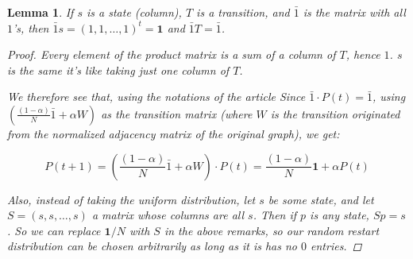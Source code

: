 \documentclass[a4paper,10pt]{article}
\theoremstyle{definition}
\theoremstyle{remark}
\theoremstyle{plain}
\newtheorem{lemma}{Lemma}[section]
\begin{document}
\begin{lemma}
\label{theonelemma}
If $s$ is a state (column), $T$ is a transition, and $\bar{1}$ is the matrix with all $1$'s,
then $\bar{1}s = (1,1,\dots,1)^t = \mathbf{1}$ and $\bar{1}T = \bar{1}$.
\begin{proof}
Every element of the product matrix is a sum of a column of $T$, hence $1$.
$s$ is the same it's like taking just one column of $T$.

We therefore see that, using the notations of the article
\parencite{cowen2017network}
Since $\bar{1} \cdot P(t) = \bar{1}$, using 
$(\frac{(1-\alpha)}{N}\bar{1} + \alpha W)$ as the transition matrix (where $W$
is the transition originated from the normalized adjacency matrix of the
original graph), we get:

$$
P(t+1) = (\frac{(1-\alpha)}{N}\bar{1} + \alpha W) \cdot P(t) = 
\frac{(1-\alpha)}{N}\mathbf{1} + \alpha P(t)
$$

Also, instead of taking the uniform distribution, let $s$ be some state, and let
$S = (s,s,\dots,s)$ a matrix whose columns are all $s$. Then if $p$ is any
state, $Sp = s$. So we can replace $\mathbf{1}/N$ with $S$ in the above
remarks, so our random restart distribution can be chosen arbitrarily as long as
it is has no $0$ entries.

\end{proof}
\end{lemma}
\end{document}
